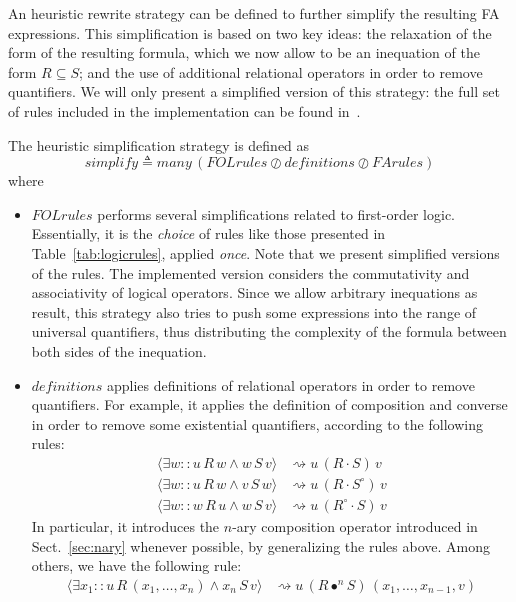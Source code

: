 \documentclass{llncs}
\begin{document}
An heuristic rewrite strategy can be defined to further simplify the
resulting FA expressions. This simplification is based on two key
ideas: the relaxation of the form of the resulting formula, which we
now allow to be an inequation of the form $R \subseteq S$; and the use of
additional relational operators in order to remove quantifiers. We
will only present a simplified version of this strategy: the full set
of rules included in the implementation can be found in~\cite{allpf}.

The heuristic simplification strategy is defined as
\begin{equation*}
\mathit{simplify} \triangleq \mathit{many} \, (\mathit{FOLrules} \oslash \mathit{definitions} \oslash \mathit{FArules})
\end{equation*}
where
\begin{itemize}
\item $\mathit{FOLrules}$ performs several simplifications related to
  first-order logic. Essentially, it is the \emph{choice} of rules like those
  presented in Table~\ref{tab:logicrules}, applied \emph{once}. Note
  that we present simplified versions of the rules. The implemented
  version considers the commutativity and associativity of logical
  operators. Since we allow arbitrary inequations as result, this
  strategy also tries to push some expressions into the range of
  universal quantifiers, thus distributing the complexity of the
  formula between both sides of the inequation.
\item $\mathit{definitions}$ applies definitions of relational
  operators in order to remove quantifiers. For example, it applies
  the definition of composition and converse in order to remove some
  existential quantifiers, according to the following rules:
  \begin{align*}
    \langle \exists w :: u \, R \, w \wedge w \, S \, v \rangle & \rightsquigarrow u \, (R \cdot S) \, v \\
    \langle \exists w :: u \, R \, w \wedge v \, S \, w \rangle & \rightsquigarrow u \, (R \cdot S^\circ) \, v \\
    \langle \exists w :: w \, R \, u \wedge w \, S \, v \rangle & \rightsquigarrow u \, (R^\circ \cdot S) \, v
  \end{align*}
  In particular, it introduces the $n$-ary composition operator
  introduced in Sect.~\ref{sec:nary} whenever possible, by
  generalizing the rules above. Among others, we have the following
  rule:
  \begin{align*}
    \langle \exists x_1 :: u \, R \, (x_1,\dots,x_n) \wedge x_n \, S \, v \rangle & \rightsquigarrow u \, (R \bullet^n S) \, (x_1,\dots,x_{n-1},v)

\end{align*}
\end{itemize}
\end{document}
